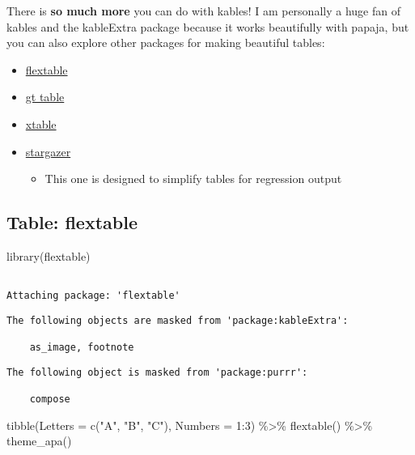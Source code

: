 \documentclass[
  letterpaper,
  DIV=11,
  numbers=noendperiod]{scrartcl}
\newenvironment{Shaded}{\begin{snugshade}}{\end{snugshade}}
\newcommand{\AttributeTok}[1]{\textcolor[rgb]{0.40,0.45,0.13}{#1}}
\newcommand{\DecValTok}[1]{\textcolor[rgb]{0.68,0.00,0.00}{#1}}
\newcommand{\FunctionTok}[1]{\textcolor[rgb]{0.28,0.35,0.67}{#1}}
\newcommand{\NormalTok}[1]{\textcolor[rgb]{0.00,0.23,0.31}{#1}}
\newcommand{\SpecialCharTok}[1]{\textcolor[rgb]{0.37,0.37,0.37}{#1}}
\newcommand{\StringTok}[1]{\textcolor[rgb]{0.13,0.47,0.30}{#1}}
\providecommand{\tightlist}{%
  \setlength{\itemsep}{0pt}\setlength{\parskip}{0pt}}\usepackage{longtable,booktabs,array}
\begin{document}
There is \textbf{so much more} you can do with kables! I am personally a
huge fan of kables and the kableExtra package because it works
beautifully with papaja, but you can also explore other packages for
making beautiful tables:

\begin{itemize}
\tightlist
\item
  \href{https://davidgohel.github.io/flextable/}{flextable}
\item
  \href{https://gt.rstudio.com/}{gt table}
\item
  \href{http://xtable.r-forge.r-project.org/}{xtable}
\item
  \href{https://cran.r-project.org/web/packages/stargazer/index.html}{stargazer}

  \begin{itemize}
  \tightlist
  \item
    This one is designed to simplify tables for regression output
  \end{itemize}
\end{itemize}

\subsection{Table: flextable}\label{table-flextable}

\begin{Shaded}
\begin{Highlighting}[]
\FunctionTok{library}\NormalTok{(flextable)}
\end{Highlighting}
\end{Shaded}

\begin{verbatim}

Attaching package: 'flextable'
\end{verbatim}

\begin{verbatim}
The following objects are masked from 'package:kableExtra':

    as_image, footnote
\end{verbatim}

\begin{verbatim}
The following object is masked from 'package:purrr':

    compose
\end{verbatim}

\begin{Shaded}
\begin{Highlighting}[]
\FunctionTok{tibble}\NormalTok{(}\AttributeTok{Letters =} \FunctionTok{c}\NormalTok{(}\StringTok{"A"}\NormalTok{, }\StringTok{"B"}\NormalTok{, }\StringTok{"C"}\NormalTok{), }
       \AttributeTok{Numbers =} \DecValTok{1}\SpecialCharTok{:}\DecValTok{3}\NormalTok{) }\SpecialCharTok{\%\textgreater{}\%} 
  \FunctionTok{flextable}\NormalTok{() }\SpecialCharTok{\%\textgreater{}\%} 
  \FunctionTok{theme\_apa}\NormalTok{() }
\end{Highlighting}
\end{Shaded}
\end{document}
